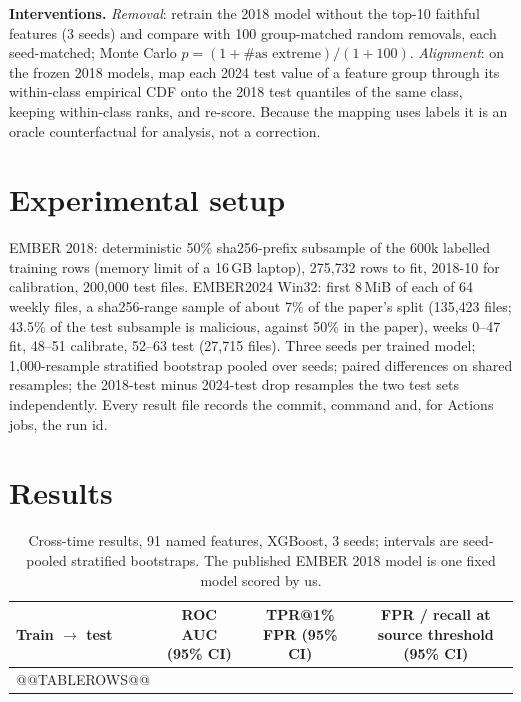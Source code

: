 \documentclass[10pt]{article}
\begin{document}
\textbf{Interventions.} \emph{Removal}: retrain the 2018 model without the top-10 faithful features
(3 seeds) and compare with 100 group-matched random removals, each seed-matched; Monte Carlo
$p = (1 + \#\text{as extreme}) / (1 + 100)$. \emph{Alignment}: on the frozen 2018 models, map each
2024 test value of a feature group through its within-class empirical CDF onto the 2018 test
quantiles of the same class, keeping within-class ranks, and re-score. Because the mapping uses labels
it is an oracle counterfactual for analysis, not a correction.

\section{Experimental setup}
EMBER 2018: deterministic 50\% sha256-prefix subsample of the 600k labelled training rows (memory
limit of a 16\,GB laptop), 275{,}732 rows to fit, 2018-10 for calibration, 200{,}000 test files.
EMBER2024 Win32: first 8\,MiB of each of 64 weekly files, a sha256-range sample of about 7\% of the
paper's split (135{,}423 files; 43.5\% of the test subsample is malicious, against 50\% in the paper),
weeks 0--47 fit, 48--51 calibrate, 52--63 test (27{,}715 files). Three seeds per trained model;
1{,}000-resample stratified bootstrap pooled over seeds; paired differences on shared resamples; the
2018-test minus 2024-test drop resamples the two test sets independently. Every result file records
the commit, command and, for Actions jobs, the run id.

\section{Results}
\begin{table}[h]\centering\small
\begin{tabular}{lccc}\toprule
Train $\rightarrow$ test & ROC AUC (95\% CI) & TPR@1\% FPR (95\% CI) & FPR / recall at source threshold (95\% CI)\\\midrule
@@TABLEROWS@@
\bottomrule
\end{tabular}
\caption{Cross-time results, 91 named features, XGBoost, 3 seeds; intervals are seed-pooled stratified
bootstraps. The published EMBER 2018 model is one fixed model scored by us.}\label{tab:cross}\end{table}
\end{document}
